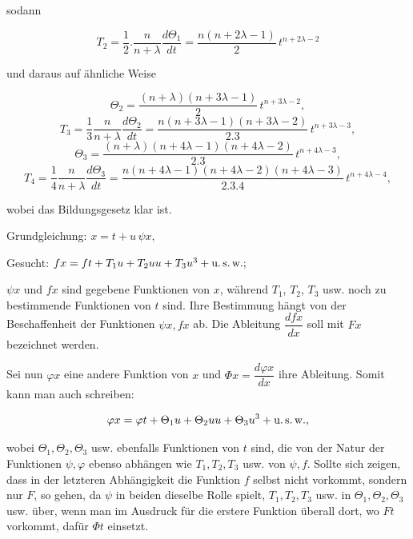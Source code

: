 %

\noindent sodann

\[ T_2 = \frac{1}{2}\mathord{.}\frac{n}{n+\lambda}\frac{d\Theta_1}{dt} = \frac{n(n+2\lambda-1)}{2}\, t^{n+2\lambda-2} \]

\noindent und daraus auf ähnliche Weise

\[ \Theta_2 = \frac{(n+\lambda)(n+3\lambda-1)}{2}\, t^{n+3\lambda-2}, \]
\[ T_3 = \frac{1}{3}\frac{n}{n+\lambda}\frac{d\Theta_2}{dt} = \frac{n(n+3\lambda-1)(n+3\lambda-2)}{2.3}\, t^{n+3\lambda-3}, \]
\[ \Theta_3 = \frac{(n+\lambda)(n+4\lambda-1)(n+4\lambda-2)}{2.3}\, t^{n+4\lambda-3}, \]
\[ T_4 = \frac{1}{4}\frac{n}{n+\lambda}\frac{d\Theta_3}{dt} = \frac{n(n+4\lambda-1)(n+4\lambda-2)(n+4\lambda-3)}{2.3.4}\, t^{n+4\lambda-4}, \]

\noindent wobei das Bildungsgesetz klar ist.

\begin{center}\end{center}

\noindent Grundgleichung: \quad $x = t + u\,\psi x,$

\noindent Gesucht: \quad $fx = ft + T_1 u + T_2 uu + T_3 u^3 + \text{u.\,s.\,w.};$

\noindent $\psi x$ und $fx$ sind gegebene Funktionen von $x$, während $T_1$, $T_2$, $T_3$ usw. noch zu bestimmende Funktionen von $t$ sind. Ihre Bestimmung hängt von der Beschaffenheit der Funktionen $\psi x, fx$ ab. Die Ableitung $\dfrac{dfx}{dx}$ soll mit $Fx$ bezeichnet werden.

Sei nun $\varphi x$ eine andere Funktion von $x$ und $\Phi x = \dfrac{d\varphi x}{dx}$ ihre Ableitung. Somit kann man auch schreiben:

\[ \varphi x = \varphi t + \Theta_1 u + \Theta_2 uu + \Theta_3 u^3 + \text{u.\,s.\,w.}, \]

\noindent wobei $\Theta_1, \Theta_2, \Theta_3$ usw. ebenfalls Funktionen von $t$ sind, die von der Natur der Funktionen $\psi, \varphi$ ebenso abhängen wie $T_1, T_2, T_3$ usw. von $\psi, f$. Sollte sich zeigen, dass in der letzteren Abhängigkeit die Funktion $f$ selbst nicht vorkommt, sondern nur $F$, so gehen, da $\psi$ in beiden dieselbe Rolle spielt, $T_1, T_2, T_3$ usw. in $\Theta_1, \Theta_2, \Theta_3$ usw. über, wenn man im Ausdruck für die erstere Funktion überall dort, wo $Ft$ vorkommt, dafür $\Phi t$ einsetzt.
